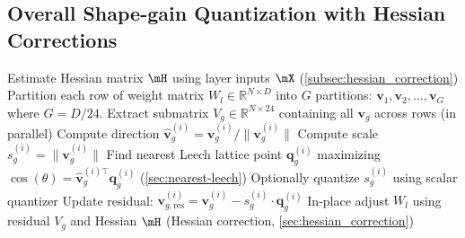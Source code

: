 \documentclass{article}
\theoremstyle{plain}
\theoremstyle{definition}
\theoremstyle{remark}
\begin{document}

\subsection{Overall Shape-gain Quantization with Hessian Corrections}

\begin{algorithm}[H]
\caption{Overall Shape-gain Quantization with Hessian Corrections}
\begin{algorithmic}[1]
    \State Estimate Hessian matrix $\mH$ using layer inputs $\mX$ (\autoref{subsec:hessian_correction})
    \State Partition each row of weight matrix $W_l \in \mathbb{R}^{N \times D}$ into $G$ partitions: $\mathbf{v}_1, \mathbf{v}_2, \dots, \mathbf{v}_G$ where $G = D/24$.
        \State Extract submatrix $V_g \in \mathbb{R}^{N \times 24}$ containing all $\mathbf{v}_g$ across rows
         (in parallel)
            \State Compute direction $\hat{\mathbf{v}}_g^{(i)} = \mathbf{v}_g^{(i)} / \|\mathbf{v}_g^{(i)}\|$
            \State Compute scale $s_g^{(i)} = \|\mathbf{v}_g^{(i)}\|$
            \State Find nearest Leech lattice point $\mathbf{q}_g^{(i)}$ maximizing $\cos(\theta) = \hat{\mathbf{v}}_g^{(i)\top} \mathbf{q}_g^{(i)}$ (\autoref{sec:nearest-leech})
            \State Optionally quantize $s_g^{(i)}$ using scalar quantizer
            \State Update residual: $\mathbf{v}_{g,\text{res}}^{(i)} = \mathbf{v}_g^{(i)} - s_g^{(i)} \cdot \mathbf{q}_g^{(i)}$
        \EndFor
        \State In-place adjust $W_l$ using residual $V_g$ and Hessian $\mH$ (Hessian correction, \autoref{sec:hessian_correction})
    \EndFor
\EndFor
\end{algorithmic}
\end{algorithm}
\end{document}
